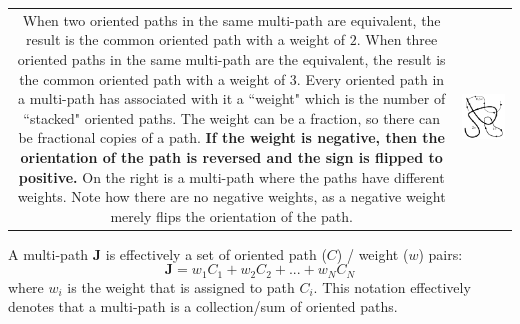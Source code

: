 \begin{tabular}{cc}
\parbox{0.5\textwidth}{
When two oriented paths in the same multi-path are equivalent, the result is the common oriented path with a weight of \(2\). When three oriented paths in the same multi-path are the equivalent, the result is the common oriented path with a weight of \(3\). Every oriented path in a multi-path has associated with it a ``weight" which is the number of ``stacked" oriented paths. The weight can be a fraction, so there can be fractional copies of a path. {\bf If the weight is negative, then the orientation of the path is reversed and the sign is flipped to positive.} On the right is a multi-path where the paths have different weights. Note how there are no negative weights, as a negative weight merely flips the orientation of the path.  
} & \parbox{0.5\textwidth}{
\includegraphics[scale = 0.75]{Multi-structures/Multipaths/multi-path_multiplicity}
}
\end{tabular}

A multi-path \(\mathbf{J}\) is effectively a set of oriented path (\(C\)) / weight (\(w\)) pairs:
\[\mathbf{J} = w_1 C_1 + w_2 C_2 + ... + w_N C_N\]
where \(w_i\) is the weight that is assigned to path \(C_i\). This notation effectively denotes that a multi-path is a collection/sum of oriented paths.

